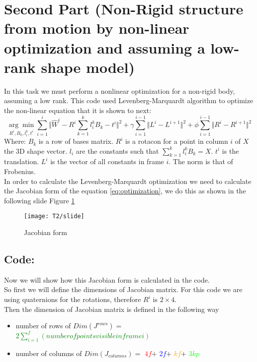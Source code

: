 \section{Second Part (Non-Rigid structure from motion by non-linear optimization and assuming a low-rank shape model)}
\noindent In this task we must perform a nonlinear optimization for a non-rigid body, assuming a low rank. This code used Levenberg-Marquardt algorithm to optimize the non-linear equation that it is shown to next:
\begin{equation}\label{eq:optimization}
\underset{R^{i},B_{k},l_{i}^{k},t^{i}}{\arg\min}
\sum_{i=1}^{i}\Vert \widehat{W}^{i}-R^{i}\sum_{k=1}^{k}l_{i}^{k}B_{k}-t^{i}\Vert^{2}+
\gamma\sum_{i=1}^{i-1}\Vert L^{i}-L^{i+1} \Vert^{2}+
\phi\sum_{i=1}^{i-1}\Vert R^{i}-R^{i+1} \Vert^{2}
\end{equation}
\noindent Where:
$B_{k}$ is a row of bases matrix.
$R^{i}$ is a rotacon for a point in column $i$ of $X$ the 3D shape vector.
$l_{i}$ are the constants such that $\sum_{k=1}^{k}l_{i}^{k}B_{k}=X$.
$t^{i}$ is the translation.
$L^{i}$ is the vector of all constants in frame $i$.
\noindent The norm is that of Frobenius.\\

\noindent In order to calculate the Levenberg-Marquardt optimization we need to calculate the Jacobian form of the equation \ref{eq:optimization}, we do this as shown in the following slide Figure \ref{fig:slideT2}

\begin{figure}[h]
    \centering
    \texttt{[image: T2/slide]}
    \caption{Jacobian form}
    \label{fig:slideT2}
\end{figure}

\subsection{Code:}
\noindent Now we will show how this Jacobian form is calculated in the code.\\

\noindent So first we will define the dimensions of Jacobian matrix. For this code we are using quaternions for the rotations, therefore $R^{i}$ is $2\times 4$.\\

\noindent Then the dimension of Jacobian matrix is defined in the following way

\begin{itemize}
	\item number of rows of $Dim(J^{rows})=$
	\textcolor{green}{$2\sum_{i=1}^{f}(number of points visible in frame i)$}
	\item number of columns of $Dim(J_{columns})=$
	\textcolor{red}{$4f$}$+$
	\textcolor{blue}{$2f$}$+$
	\textcolor{orange}{$kf$}$+$
	\textcolor{lime}{$3kp$}	
\end{itemize}
	
